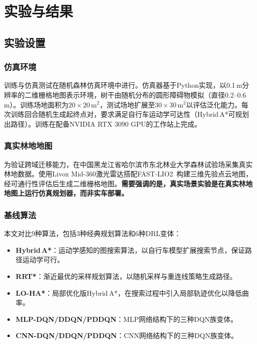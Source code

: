 \documentclass[twocolumn]{elsarticle}
\begin{document}
\section{实验与结果}\label{sec:results}

\subsection{实验设置}

\subsubsection{仿真环境}

训练与仿真测试在随机森林仿真环境中进行。仿真器基于Python实现，以0.1\,m分辨率的二维栅格地图表示环境，树干由随机分布的圆形障碍物模拟（直径0.2--0.6\,m）。训练场地面积为$20\times20$\,m$^2$，测试场地扩展至$30\times30$\,m$^2$以评估泛化能力。每次训练回合随机生成起终点对，要求满足自行车运动学可达性（Hybrid\,A*可规划出路径）。训练在配备NVIDIA RTX 3090 GPU的工作站上完成。

\subsubsection{真实林地地图}

为验证跨域迁移能力，在中国黑龙江省哈尔滨市东北林业大学森林试验场采集真实林地数据。使用Livox Mid-360激光雷达搭配FAST-LIO2~\cite{xu2022fastlio2}构建三维先验点云地图，经可通行性评估后生成二维栅格地图。\textbf{需要强调的是，真实场景实验是在真实林地地图上运行仿真规划器，而非实车部署。}

\subsubsection{基线算法}

本文对比9种算法，包括3种经典规划算法和6种DRL变体：

\begin{itemize}
  \item \textbf{Hybrid\,A*}：运动学感知的图搜索算法，以自行车模型扩展搜索节点，保证路径运动学可行。
  \item \textbf{RRT*}：渐近最优的采样规划算法，以随机采样与重连线策略生成路径。
  \item \textbf{LO-HA*}：局部优化版Hybrid\,A*，在搜索过程中引入局部轨迹优化以降低曲率。
  \item \textbf{MLP-DQN/DDQN/PDDQN}：MLP网络结构下的三种DQN族变体。
  \item \textbf{CNN-DQN/DDQN/PDDQN}：CNN网络结构下的三种DQN族变体。
\end{itemize}
\end{document}
